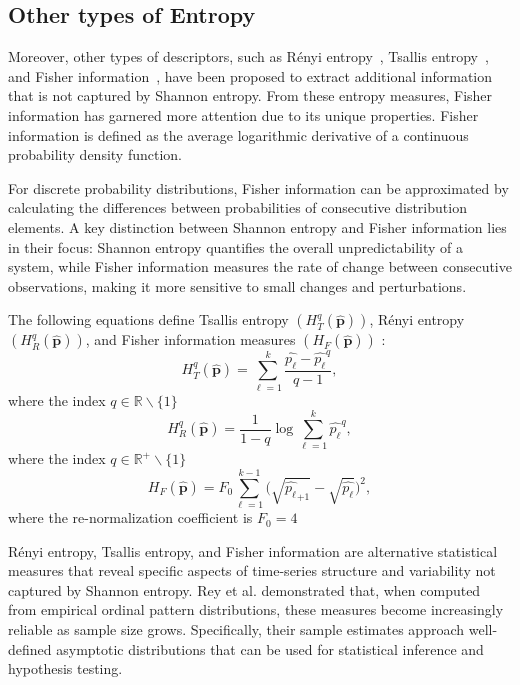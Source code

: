 \documentclass[12pt,a4paper]{article}
\begin{document}
\subsection{Other types of Entropy}

Moreover, other types of descriptors, such as Rényi entropy~\cite{renyi1961measures}, Tsallis entropy~\cite{tsallis1988possible}, and Fisher information~\cite{frieden2004science}, have been proposed to extract additional information that is not captured by Shannon entropy.
From these entropy measures, Fisher information has garnered more attention due to its unique properties. Fisher information is defined as the average logarithmic derivative of a continuous probability density function.

For discrete probability distributions, Fisher information can be approximated by calculating the differences between probabilities of consecutive distribution elements. A key distinction between Shannon entropy and Fisher information lies in their focus: Shannon entropy quantifies the overall unpredictability of a system, while Fisher information measures the rate of change between consecutive observations, making it more sensitive to small changes and perturbations.

The following equations define Tsallis entropy $	(H_{T}^{q}(\widehat{\mathbf{p}}))$, Rényi entropy $(H_{R}^{q}(\widehat{\mathbf{p}}))$, and Fisher information measures $(H_{F}(\widehat{\mathbf{p}}))$ \cite{sanchez2009discrete} :
\begin{equation}
	H_{T}^{q}(\widehat{\mathbf{p}})=\sum_{\ell=1}^{k}\dfrac{\widehat{p_\ell}-\widehat{p_\ell}^q}{q-1},
\end{equation}
where the index $q\in \mathbb{R}\backslash \{1\}$
\begin{equation}
	H_{R}^{q}(\widehat{\mathbf{p}})=\dfrac{1}{1-q} \log \sum_{\ell=1}^{k}{\widehat{p_\ell}}^q,
\end{equation}
where the index $q\in \mathbb{R}^{+}\backslash \{1\}$
\begin{equation}
	H_F(\widehat{\mathbf{p}})=F_0\sum_{\ell=1}^{k-1}\Big(\sqrt{\widehat{p_\ell}_{+1}}-\sqrt{\widehat{p_\ell}}\Big)^2 ,
\end{equation}
where the re-normalization coefficient is $F_0=4$ \cite{sanchez2009discrete}

Rényi entropy, Tsallis entropy, and Fisher information are alternative statistical measures that reveal specific aspects of time-series structure and variability not captured by Shannon entropy. Rey et al. demonstrated that, when computed from empirical ordinal pattern distributions, these measures become increasingly reliable as sample size grows. Specifically, their sample estimates approach well-defined asymptotic distributions that can be used for statistical inference and hypothesis testing.
\end{document}
